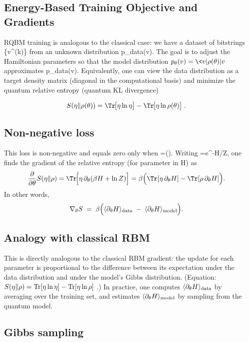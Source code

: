 \documentclass[%
oneside,                 %
final,                   %
10pt]{article}
\begin{document}
\subsection{Energy-Based Training Objective and Gradients}

RQBM training is analogous to the classical case: we have a dataset of
bitstrings \{v^{(k)}\} from an unknown distribution p_{\rm data}(v).
The goal is to adjust the Hamiltonian parameters \theta so that the
model distribution \(p_\theta(v)=\<v|\rho(\theta)|v\>\) approximates
p_{\rm data}(v).  Equivalently, one can view the data distribution as
a target density matrix \eta (diagonal in the computational basis) and
minimize the quantum relative entropy (quantum KL divergence)

\[
S(\eta\Vert \rho(\theta)) = \Tr\!\bigl[\eta\ln\eta\bigr] - \Tr\!\bigl[\eta\ln\rho(\theta)\bigr] \;.
\]

\subsection{Non-negative loss}
This loss is non-negative and equals zero only when \eta=\rho(\theta).
Writing \rho=e^{-H}/Z, one finds the gradient of the relative entropy
(for parameter \theta in H) as
\[
\frac{\partial}{\partial\theta} S(\eta\Vert\rho)
= \Tr\!\Bigl[\eta\,\partial_\theta(\beta H + \ln Z)\Bigr]
= \beta\Bigl(\Tr[\eta\,\partial_\theta H] - \Tr[\rho\,\partial_\theta H]\Bigr).
\]
In other words,
\[
\nabla_\theta S \;=\; \beta\Bigl(\langle \partial_\theta H\rangle_{\rm data} \;-\; \langle \partial_\theta H\rangle_{\rm model}\Bigr).
\]

\subsection{Analogy with classical RBM}
This is directly analogous to the classical RBM gradient: the update
for each parameter is proportional to the difference between its
expectation under the data distribution and under the model’s Gibbs
distribution.  (Equation: $S(\eta\Vert\rho)={\rm Tr}[\eta\ln\eta]-{\rm
Tr}[\eta\ln\rho]$ .)  In practice, one computes $\langle
\partial_\theta H\rangle_{\rm data}$ by averaging over the training
set, and estimates $\langle \partial_\theta H\rangle_{\rm model}$ by
sampling from the quantum model.

\subsection{Gibbs sampling}
\end{document}
